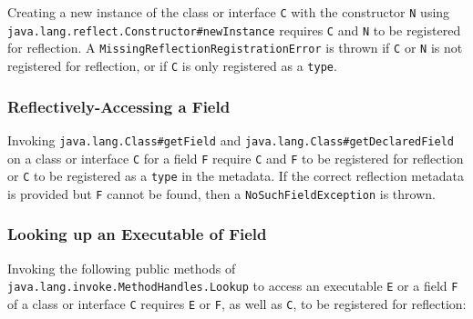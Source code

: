 Creating a new instance of the class or interface \verb|C| with the constructor \verb|N| using \texttt{java.lang.reflect.Constructor\#newInstance} requires \verb|C| and \verb|N| to be registered for reflection. A \texttt{MissingReflectionRegistrationError} is thrown if \verb|C| or \verb|N| is not registered for reflection, or if \verb|C| is only registered as a \texttt{type}.

\subsubsection{Reflectively-Accessing a Field}
Invoking \texttt{java.lang.Class\#getField} and \texttt{java.lang.Class\#getDeclaredField} on a class or interface \verb|C| for a field \verb|F| require \verb|C| and \verb|F| to be registered for reflection or \verb|C| to be registered as a \texttt{type} in the metadata. If the correct reflection metadata is provided but \verb|F| cannot be found, then a \texttt{NoSuchFieldException} is thrown.

\subsubsection{Looking up an Executable of Field}
Invoking the following public methods of \texttt{java.lang.invoke.MethodHandles.Lookup} to access an executable \verb|E| or a field \verb|F| of a class or interface \verb|C| requires \verb|E| or \verb|F|, as well as \verb|C|, to be registered for reflection: 


